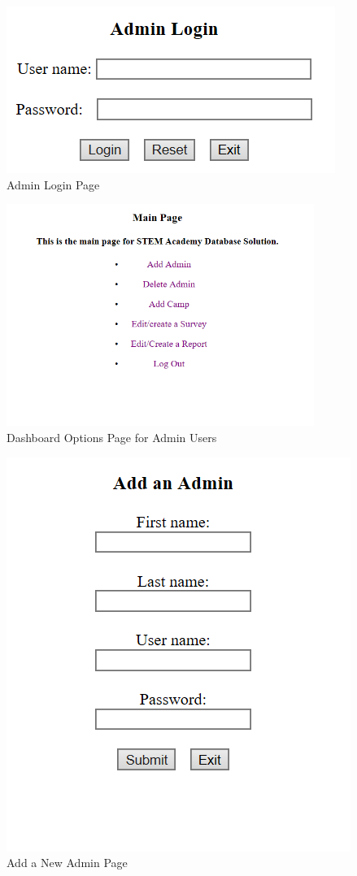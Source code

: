 \documentclass[letterpaper,10pt,serif,draftclsnofoot,onecolumn,compsoc,titlepage]{IEEEtran}
\begin{document}
\begin{figure}[!htbp]
\centering
\includegraphics[scale=.9]{ProjectImages/AdminLogin.png}
\caption{Admin Login Page}
\label{fig:code2}
\end{figure}

\begin{figure}[!htbp]
\centering
\includegraphics[scale=.2, width=100mm]{ProjectImages/Dashboard.png}
\caption{Dashboard Options Page for Admin Users}
\label{fig:code2}
\end{figure}

\begin{figure}[!htbp]
\centering
\includegraphics[scale=.9]{ProjectImages/AddAdmin.png}
\caption{Add a New Admin Page}
\label{fig:code2}
\end{figure}
\end{document}
